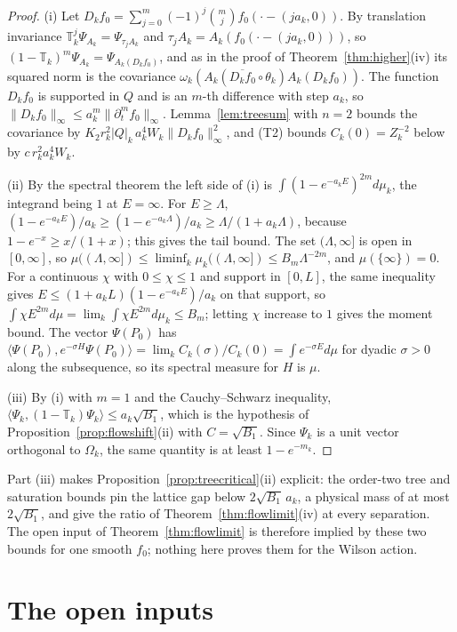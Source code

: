 \documentclass[11pt]{amsart}
\theoremstyle{definition}
\theoremstyle{remark}
\numberwithin{equation}{section}
\newcommand{\ip}[2]{\langle #1,#2\rangle}
\begin{document}
\begin{proof}
(i) Let $D_kf_0=\sum_{j=0}^m(-1)^j\binom mjf_0(\cdot-(ja_k,0))$. By
translation invariance $\mathbb T_k^j\Psi_{A_k}=\Psi_{\tau_jA_k}$ and
$\tau_jA_k=A_k(f_0(\cdot-(ja_k,0)))$, so
$(1-\mathbb T_k)^m\Psi_{A_k}=\Psi_{A_k(D_kf_0)}$, and as in the proof of
Theorem~\ref{thm:higher}(iv) its squared norm is the covariance
$\omega_k(A_k(\overline{D_kf_0}\circ\theta_k)A_k(D_kf_0))$. The function
$D_kf_0$ is supported in $Q$ and is an $m$-th difference with step $a_k$, so
$\|D_kf_0\|_\infty\le a_k^m\|\partial_t^mf_0\|_\infty$. Lemma~\ref{lem:treesum}
with $n=2$ bounds the covariance by
$K_2r_k^2|Q|_k\,a_k^4W_k\|D_kf_0\|_\infty^2$, and (T2) bounds $C_k(0)=Z_k^{-2}$
below by $c\,r_k^2a_k^4W_k$.

(ii) By the spectral theorem the left side of (i) is
$\int(1-e^{-a_kE})^{2m}d\mu_k$, the integrand being $1$ at $E=\infty$. For
$E\ge\Lambda$, $(1-e^{-a_kE})/a_k\ge(1-e^{-a_k\Lambda})/a_k\ge
\Lambda/(1+a_k\Lambda)$, because $1-e^{-x}\ge x/(1+x)$; this gives the tail
bound. The set $(\Lambda,\infty]$ is open in $[0,\infty]$, so
$\mu((\Lambda,\infty])\le\liminf_k\mu_k((\Lambda,\infty])\le B_m\Lambda^{-2m}$,
and $\mu(\{\infty\})=0$. For a continuous $\chi$ with $0\le\chi\le1$ and support
in $[0,L]$, the same inequality gives $E\le(1+a_kL)(1-e^{-a_kE})/a_k$ on that
support, so $\int\chi E^{2m}d\mu=\lim_k\int\chi E^{2m}d\mu_k\le B_m$; letting
$\chi$ increase to $1$ gives the moment bound. The vector $\Psi(P_0)$ has
$\ip{\Psi(P_0)}{e^{-\sigma H}\Psi(P_0)}=\lim_kC_k(\sigma)/C_k(0)=\int
e^{-\sigma E}d\mu$ for dyadic $\sigma>0$ along the subsequence, so its spectral
measure for $H$ is $\mu$.

(iii) By (i) with $m=1$ and the Cauchy--Schwarz inequality,
$\ip{\Psi_k}{(1-\mathbb T_k)\Psi_k}\le a_k\sqrt{B_1}$, which is the hypothesis
of Proposition~\ref{prop:flowshift}(ii) with $C=\sqrt{B_1}$. Since $\Psi_k$ is
a unit vector orthogonal to $\Omega_k$, the same quantity is at least
$1-e^{-m_k}$.
\end{proof}

Part (iii) makes Proposition~\ref{prop:treecritical}(ii) explicit: the order-two
tree and saturation bounds pin the lattice gap below $2\sqrt{B_1}\,a_k$, a
physical mass of at most $2\sqrt{B_1}$, and give the ratio of
Theorem~\ref{thm:flowlimit}(iv) at every separation. The open input of
Theorem~\ref{thm:flowlimit} is therefore implied by these two bounds for one
smooth $f_0$; nothing here proves them for the Wilson action.

\section{The open inputs}\label{sec:inputs}
\end{document}
